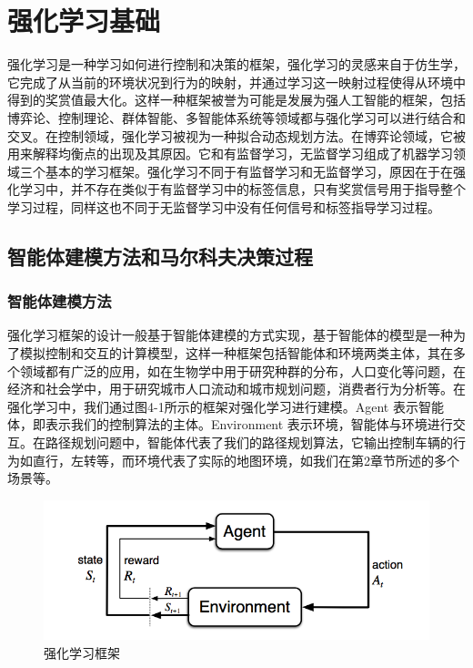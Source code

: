 \documentclass{standalone}
\begin{document}
\chapter{强化学习基础}

强化学习是一种学习如何进行控制和决策的框架，强化学习的灵感来自于仿生学，它完成了从当前的环境状况到行为的映射，并通过学习这一映射过程使得从环境中得到的奖赏值最大化。这样一种框架被誉为可能是发展为强人工智能的框架，包括博弈论、控制理论、群体智能、多智能体系统等领域都与强化学习可以进行结合和交叉。在控制领域，强化学习被视为一种拟合动态规划方法。在博弈论领域，它被用来解释均衡点的出现及其原因。它和有监督学习，无监督学习组成了机器学习领域三个基本的学习框架。强化学习不同于有监督学习和无监督学习，原因在于在强化学习中，并不存在类似于有监督学习中的标签信息，只有奖赏信号用于指导整个学习过程，同样这也不同于无监督学习中没有任何信号和标签指导学习过程。\par

\section{智能体建模方法和马尔科夫决策过程}
\subsection{智能体建模方法}
强化学习框架的设计一般基于智能体建模的方式实现，基于智能体的模型是一种为了模拟控制和交互的计算模型，这样一种框架包括智能体和环境两类主体，其在多个领域都有广泛的应用，如在生物学中用于研究种群的分布，人口变化等问题，在经济和社会学中，用于研究城市人口流动和城市规划问题，消费者行为分析等。在强化学习中，我们通过图4-1所示的框架对强化学习进行建模。Agent 表示智能体，即表示我们的控制算法的主体。Environment 表示环境，智能体与环境进行交互。在路径规划问题中，智能体代表了我们的路径规划算法，它输出控制车辆的行为如直行，左转等，而环境代表了实际的地图环境，如我们在第2章节所述的多个场景等。
\begin{figure}[H]
	\includegraphics[width=12.0cm]{pic/4-1.png}
	\caption{强化学习框架}
	\label{4-1}
\end{figure}
\end{document}
